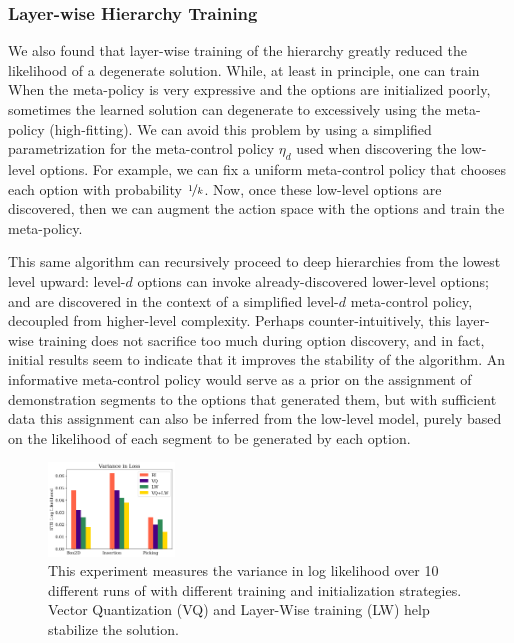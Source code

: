 \subsubsection{Layer-wise Hierarchy Training}
We also found that layer-wise training of the hierarchy greatly reduced the likelihood of a degenerate solution.
While, at least in principle, one can train 
When the meta-policy is very expressive and the options are initialized poorly, sometimes the learned solution can degenerate to excessively using the meta-policy (high-fitting). 
We can avoid this problem by using a simplified parametrization for the meta-control policy $\eta_d$ used when discovering the low-level options. For example, we can fix a uniform meta-control policy that chooses each option with probability $\nicefrac 1 {k}$. Now, once these low-level options are discovered, then we can augment the action space with the options and train the meta-policy.

This same algorithm can recursively proceed to deep hierarchies from the lowest level upward: level-$d$ options can invoke already-discovered lower-level options; and are discovered in the context of a simplified level-$d$ meta-control policy, decoupled from higher-level complexity.
Perhaps counter-intuitively, this layer-wise training does not sacrifice too much during option discovery, and in fact, initial results seem to indicate that it improves the stability of the algorithm.
An informative meta-control policy would serve as a prior on the assignment of demonstration segments to the options that generated them, but with sufficient data this assignment can also be inferred from the low-level model, purely based on the likelihood of each segment to be generated by each option.

\begin{figure} [ht!]
\centering
    \includegraphics[width=0.3\textwidth]{ddco-experiments/exp8-1.png}
    \caption{This experiment measures the variance in log likelihood over 10 different runs of \alg with different training and initialization strategies. Vector Quantization (VQ) and Layer-Wise training (LW) help stabilize the solution. \label{fig:exp81}}
\end{figure}


